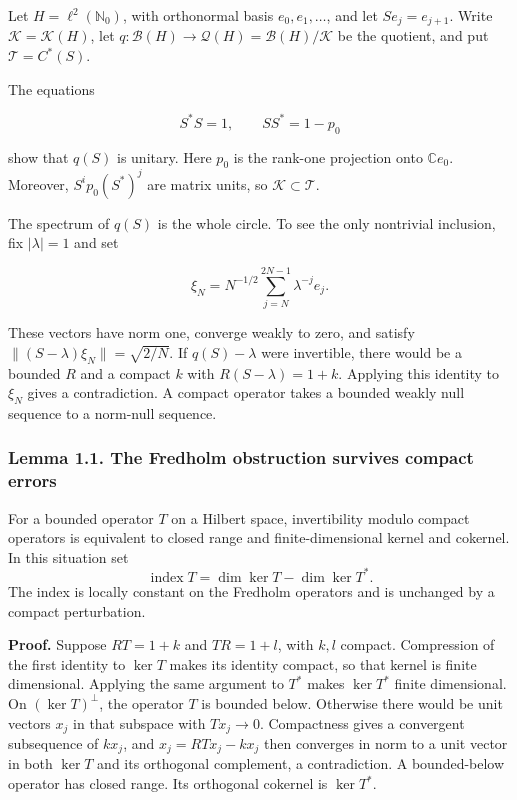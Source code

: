 \documentclass[
  11pt,
]{article}
\begin{document}
Let \(H=\ell^2(\mathbb N_0)\), with orthonormal basis
\(e_0,e_1,\ldots\), and let \(S e_j=e_{j+1}\). Write
\(\mathcal K=\mathcal K(H)\), let
\(q:\mathcal B(H)\to\mathcal Q(H)=\mathcal B(H)/\mathcal K\) be the
quotient, and put \(\mathcal T=C^*(S)\).

The equations

\[
S^*S=1,\qquad SS^*=1-p_0
\]

show that \(q(S)\) is unitary. Here \(p_0\) is the rank-one projection
onto \(\mathbb C e_0\). Moreover, \(S^i p_0(S^*)^j\) are matrix units,
so \(\mathcal K\subset\mathcal T\).

The spectrum of \(q(S)\) is the whole circle. To see the only nontrivial
inclusion, fix \(|\lambda|=1\) and set

\[
\xi_N=N^{-1/2}\sum_{j=N}^{2N-1}\lambda^{-j}e_j.
\]

These vectors have norm one, converge weakly to zero, and satisfy
\(\|(S-\lambda)\xi_N\|=\sqrt{2/N}\). If \(q(S)-\lambda\) were
invertible, there would be a bounded \(R\) and a compact \(k\) with
\(R(S-\lambda)=1+k\). Applying this identity to \(\xi_N\) gives a
contradiction. A compact operator takes a bounded weakly null sequence
to a norm-null sequence.

\subsubsection{Lemma 1.1. The Fredholm obstruction survives compact
errors}\label{lemma-1.1.-the-fredholm-obstruction-survives-compact-errors}

For a bounded operator \(T\) on a Hilbert space, invertibility modulo
compact operators is equivalent to closed range and finite-dimensional
kernel and cokernel. In this situation set \[
\operatorname{index}T=\dim\ker T-\dim\ker T^*.
\] The index is locally constant on the Fredholm operators and is
unchanged by a compact perturbation.

\textbf{Proof.} Suppose \(RT=1+k\) and \(TR=1+l\), with \(k,l\) compact.
Compression of the first identity to \(\ker T\) makes its identity
compact, so that kernel is finite dimensional. Applying the same
argument to \(T^*\) makes \(\ker T^*\) finite dimensional. On
\((\ker T)^\perp\), the operator \(T\) is bounded below. Otherwise there
would be unit vectors \(x_j\) in that subspace with \(Tx_j\to0\).
Compactness gives a convergent subsequence of \(kx_j\), and
\(x_j=RTx_j-kx_j\) then converges in norm to a unit vector in both
\(\ker T\) and its orthogonal complement, a contradiction. A
bounded-below operator has closed range. Its orthogonal cokernel is
\(\ker T^*\).
\end{document}
